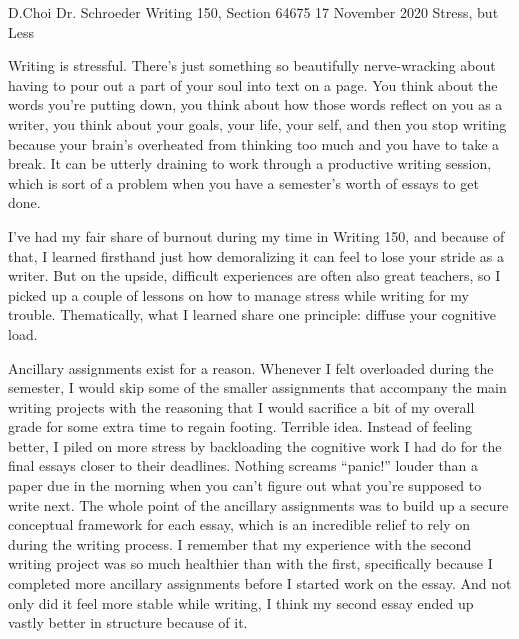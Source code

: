 \documentclass[12pt, letterpaper]{article}
\begin{document}
\begin{mla}
	{D.}{Choi}
	{Dr. Schroeder}
	{Writing 150, Section 64675}
	{17 November 2020}
	{Stress, but Less}


Writing is stressful. There's just something so beautifully nerve-wracking
about having to pour out a part of your soul into text on a page. You think
about the words you're putting down, you think about how those words reflect
on you as a writer, you think about your goals, your life, your self, and then
you stop writing because your brain's overheated from thinking too much and
you have to take a break. It can be utterly draining to work through a
productive writing session, which is sort of a problem when you have a
semester's worth of essays to get done.

I've had my fair share of burnout during my time in Writing 150, and because
of that, I learned firsthand just how demoralizing it can feel to lose your
stride as a writer. But on the upside, difficult experiences are often also
great teachers, so I picked up a couple of lessons on how to manage stress
while writing for my trouble. Thematically, what I learned share one
principle: diffuse your cognitive load.

Ancillary assignments exist for a reason. Whenever I felt overloaded during
the semester, I would skip some of the smaller assignments that accompany the
main writing projects with the reasoning that I would sacrifice a bit of my
overall grade for some extra time to regain footing. Terrible idea. Instead of
feeling better, I piled on more stress by backloading the cognitive work I had
do for the final essays closer to their deadlines. Nothing screams ``panic!''
louder than a paper due in the morning when you can't figure out what you're
supposed to write next. The whole point of the ancillary assignments was to
build up a secure conceptual framework for each essay, which is an incredible
relief to rely on during the writing process. I remember that my experience
with the second writing project was so much healthier than with the first,
specifically because I completed more ancillary assignments before I started
work on the essay. And not only did it feel more stable while writing, I think
my second essay ended up vastly better in structure because of it.


\end{mla}
\end{document}
